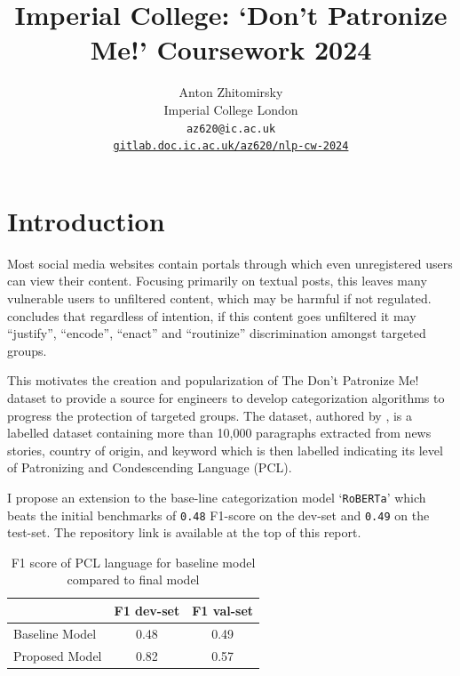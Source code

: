 \documentclass[11pt,a4paper]{article}
\title{Imperial College: `Don't Patronize Me!' Coursework 2024\\
}
\author{Anton Zhitomirsky \\
  Imperial College London \\
  \texttt{az620@ic.ac.uk} \\
  \href{https://gitlab.doc.ic.ac.uk/az620/nlp-cw-2024}{\texttt{gitlab.doc.ic.ac.uk/az620/nlp-cw-2024}}
}
\begin{document}
\maketitle

\section{Introduction}


Most social media websites contain portals through which even unregistered users can view their content. Focusing primarily on textual posts, this leaves many vulnerable users to unfiltered content, which may be harmful if not regulated. \citet{Ng-discrimination} concludes that regardless of intention, if this content goes unfiltered it may ``justify'', ``encode'', ``enact'' and ``routinize'' discrimination amongst targeted groups.

This motivates the creation and popularization of The Don't Patronize Me! dataset to provide a source for engineers to develop categorization algorithms to progress the protection of targeted groups. The dataset, authored by \citet{perez-almendros-etal-2020-dont}, is a labelled dataset containing more than 10,000 paragraphs extracted from news stories, country of origin, and keyword which is then labelled indicating its level of Patronizing and Condescending Language (PCL).

I propose an extension to the base-line categorization model `\texttt{RoBERTa}' which beats the initial benchmarks of \texttt{0.48} F1-score on the dev-set and \texttt{0.49} on the test-set. The repository link is available at the top of this report.

\begin{table}[!h]
    \centering
    \begin{tabular}{|l||c|c|}
        \hline
         & F1 dev-set & F1 val-set \\
        \hline
        \hline
        Baseline Model & 0.48 & 0.49 \\
        \hline
        Proposed Model  & 0.82 & 0.57 \\
        \hline
    \end{tabular}
    \caption{F1 score of PCL language for baseline model compared to final model}    
\end{table}
\end{document}
